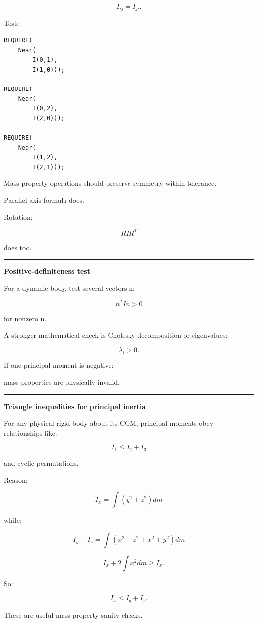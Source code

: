 \[
I_{ij}=I_{ji}.
\]

Test:

\begin{verbatim}
REQUIRE(
    Near(
        I(0,1),
        I(1,0)));

REQUIRE(
    Near(
        I(0,2),
        I(2,0)));

REQUIRE(
    Near(
        I(1,2),
        I(2,1)));
\end{verbatim}

Mass-property operations should preserve symmetry within tolerance.

Parallel-axis formula does.

Rotation:

\[
RIR^T
\]

does too.

\begin{center}\rule{0.5\linewidth}{0.5pt}\end{center}

\textbf{Positive-definiteness test}

For a dynamic body, test several vectors n:

\[
n^TIn>0
\]

for nonzero n.

A stronger mathematical check is Cholesky decomposition or eigenvalues:

\[
\lambda_i>0.
\]

If one principal moment is negative:

mass properties are physically invalid.

\begin{center}\rule{0.5\linewidth}{0.5pt}\end{center}

\textbf{Triangle inequalities for principal inertia}

For any physical rigid body about its COM, principal moments obey relationships like:

\[
I_1\le I_2+I_3
\]

and cyclic permutations.

Reason:

\[
I_x=\int(y^2+z^2)dm
\]

while:

\[
I_y+I_z
=
\int(x^2+z^2+x^2+y^2)dm
\]

\[
=
I_x+
2\int x^2dm
\ge I_x.
\]

So:

\[
\boxed{
I_x\le I_y+I_z.
}
\]

These are useful mass-property sanity checks.

